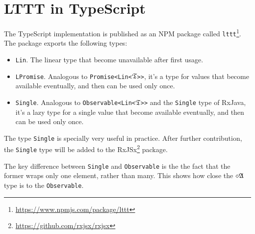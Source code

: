 \section{LTTT in TypeScript}

The TypeScript implementation is published as an NPM package called \texttt{lttt}\footnote{\url{https://www.npmjs.com/package/lttt}}. The package exports the following types:
\begin{itemize}
    \item \texttt{Lin}. The linear type that become unavailable after first usage.
    \item \texttt{LPromise}. Analogous to \texttt{Promise<Lin<}$\mathfrak{T}$\texttt{>{}>}, it's a type for values that become available eventually, and then can be used only once.
    \item \texttt{Single}. Analogous to \texttt{Observable<Lin<}$\mathfrak{T}$\texttt{>{}>} and the \texttt{Single} type of RxJava, it's a lazy type for a single value that become available eventually, and then can be used only once.
\end{itemize}

The type \texttt{Single} is specially very useful in practice. After further contribution, the \texttt{Single} type will be added to the RxJSx\footnote{\url{https://github.com/rxjsx/rxjsx}} package.

The key difference between \texttt{Single} and \texttt{Observable} is the the fact that the former wraps only one element, rather than many. This shows how close the $\diamond\mathfrak{A}$ type is to the \texttt{Observable}.